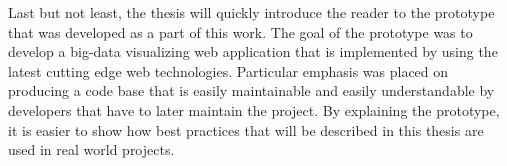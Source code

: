 Last but not least, the thesis will quickly introduce the reader to the prototype that was developed as a part of this work. The goal of the prototype was to develop a big-data visualizing web application that is implemented by using the latest cutting edge web technologies. Particular emphasis was placed on producing a code base that is easily maintainable and easily understandable by developers that have to later maintain the project. By explaining the prototype, it is easier to show how best practices that will be described in this thesis are used in real world projects.



